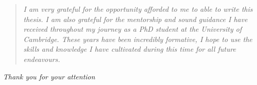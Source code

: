 \pagebreak
\hspace{0pt}
\vspace*{\fill}
\begin{quote}\emph{
I am very grateful for the opportunity afforded to me to able to write this thesis.
I am also grateful for the mentorship and sound guidance I have received throughout my journey as a PhD student at the University of Cambridge.
These years have been incredibly formative, I hope to use the skills and knowledge I have cultivated during this time for all future endeavours.%
}
\end{quote}
\mbox{}\hfill \emph{Thank you for your attention}
\vspace*{\fill}
\hspace{0pt}
\nocite{bairdFrontalLobeActivation2002}
\nocite{simmonsKissMakeUp2002}

